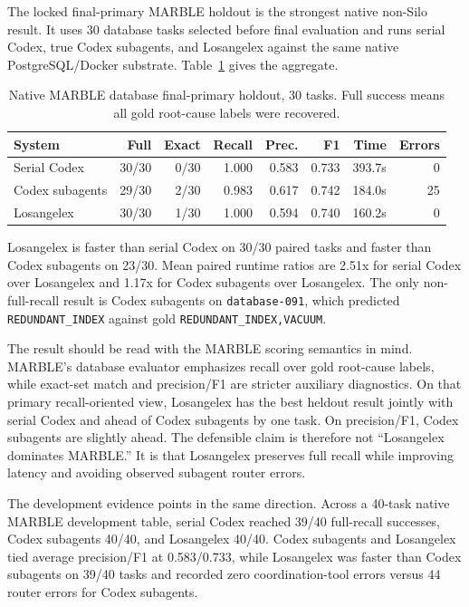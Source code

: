 \documentclass[10pt,twocolumn]{article}
\begin{document}
The locked final-primary MARBLE holdout is the strongest native non-Silo result. It uses 30 database tasks selected before final evaluation and runs serial Codex, true Codex subagents, and Losangelex against the same native PostgreSQL/Docker substrate. Table~\ref{tab:marble-final} gives the aggregate.

\begin{table}[t]
\centering
\scriptsize
\caption{Native MARBLE database final-primary holdout, 30 tasks. Full success means all gold root-cause labels were recovered.}
\begin{tabularx}{\textwidth}{@{}lrrrrrrr@{}}
\toprule
System & Full & Exact & Recall & Prec. & F1 & Time & Errors \\
\midrule
Serial Codex & 30/30 & 0/30 & 1.000 & 0.583 & 0.733 & 393.7s & 0 \\
Codex subagents & 29/30 & 2/30 & 0.983 & 0.617 & 0.742 & 184.0s & 25 \\
Losangelex & 30/30 & 1/30 & 1.000 & 0.594 & 0.740 & 160.2s & 0 \\
\bottomrule
\end{tabularx}
\label{tab:marble-final}
\end{table}

Losangelex is faster than serial Codex on 30/30 paired tasks and faster than Codex subagents on 23/30. Mean paired runtime ratios are 2.51x for serial Codex over Losangelex and 1.17x for Codex subagents over Losangelex. The only non-full-recall result is Codex subagents on \texttt{database-091}, which predicted \texttt{REDUNDANT\_INDEX} against gold \texttt{REDUNDANT\_INDEX,VACUUM}.

The result should be read with the MARBLE scoring semantics in mind. MARBLE's database evaluator emphasizes recall over gold root-cause labels, while exact-set match and precision/F1 are stricter auxiliary diagnostics. On that primary recall-oriented view, Losangelex has the best heldout result jointly with serial Codex and ahead of Codex subagents by one task. On precision/F1, Codex subagents are slightly ahead. The defensible claim is therefore not ``Losangelex dominates MARBLE.'' It is that Losangelex preserves full recall while improving latency and avoiding observed subagent router errors.

The development evidence points in the same direction. Across a 40-task native MARBLE development table, serial Codex reached 39/40 full-recall successes, Codex subagents 40/40, and Losangelex 40/40. Codex subagents and Losangelex tied average precision/F1 at 0.583/0.733, while Losangelex was faster than Codex subagents on 39/40 tasks and recorded zero coordination-tool errors versus 44 router errors for Codex subagents.
\end{document}
